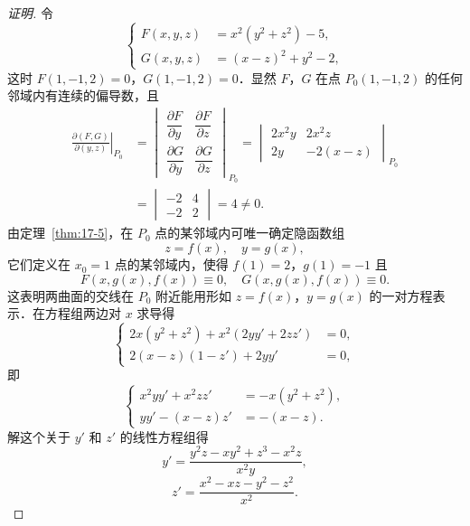 \begin{proof}[证明]
令
\[
\left\{\begin{aligned}
F(x,y,z)&=x^{2}(y^{2}+z^{2})-5,\\
G(x,y,z)&=(x-z)^{2}+y^{2}-2,
\end{aligned}\right.
\]
这时 $F(1,-1,2)=0$，$G(1,-1,2)=0$．显然 $F$，$G$ 在点 $P_{0}(1,-1,2)$ 的任何邻域内有连续的偏导数，且
\[
\begin{aligned}
\left.\frac{\partial(F,G)}{\partial(y,z)}\right|_{P_{0}}&=\begin{vmatrix}\dfrac{\partial F}{\partial y}&\dfrac{\partial F}{\partial z}\\[8pt]\dfrac{\partial G}{\partial y}&\dfrac{\partial G}{\partial z}\end{vmatrix}_{P_{0}}=\begin{vmatrix}2x^{2}y&2x^{2}z\\ 2y&-2(x-z)\end{vmatrix}_{P_{0}}\\
&=\begin{vmatrix}-2&4\\ -2&2\end{vmatrix}=4\neq0.
\end{aligned}
\]
由定理~\ref{thm:17-5}，在 $P_{0}$ 点的某邻域内可唯一确定隐函数组
\[
z=f(x),\quad y=g(x),
\]
它们定义在 $x_{0}=1$ 点的某邻域内，使得 $f(1)=2$，$g(1)=-1$ 且
\[
F(x,g(x),f(x))\equiv0,\quad G(x,g(x),f(x))\equiv0.
\]
这表明两曲面的交线在 $P_{0}$ 附近能用形如 $z=f(x)$，$y=g(x)$ 的一对方程表示．在方程组两边对 $x$ 求导得
\[
\left\{\begin{aligned}
2x(y^{2}+z^{2})+x^{2}(2yy'+2zz')&=0,\\
2(x-z)(1-z')+2yy'&=0,
\end{aligned}\right.
\]
即
\[
\left\{\begin{aligned}
x^{2}yy'+x^{2}zz'&=-x(y^{2}+z^{2}),\\
yy'-(x-z)z'&=-(x-z).
\end{aligned}\right.
\]
解这个关于 $y'$ 和 $z'$ 的线性方程组得
\[
y'=\frac{y^{2}z-xy^{2}+z^{3}-x^{2}z}{x^{2}y},
\]
\[
z'=\frac{x^{2}-xz-y^{2}-z^{2}}{x^{2}}.
\]
\end{proof}

